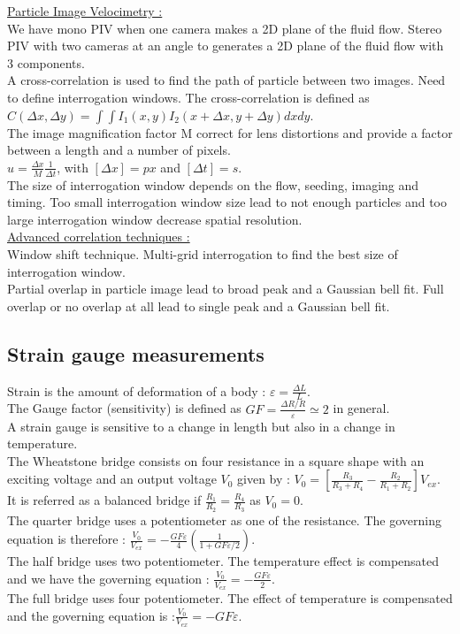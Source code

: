 \documentclass[../main.tex]{subfiles}
\begin{document}
\quad \underline{Particle Image Velocimetry :}\\
We have mono PIV when one camera makes a 2D plane of the fluid flow. Stereo PIV with two cameras at an angle to generates a 2D plane of the fluid flow with 3 components.\\
A cross-correlation is used to find the path of particle between two images. Need to define interrogation windows. The cross-correlation is defined as $C(\Delta x, \Delta y) = \int \int I_1(x,y) I_2(x+\Delta x, y+\Delta y) dxdy$.\\
The image magnification factor M correct for lens distortions and provide a factor between a length and a number of pixels.\\
$u = \frac{\Delta x}{M} \frac{1}{\Delta t}$, with $[\Delta x] = px$ and $[\Delta t] = s$.\\

The size of interrogation window depends on the flow, seeding, imaging and timing. Too small interrogation window size lead to not enough particles and too large interrogation window decrease spatial resolution.\\

\quad \underline{Advanced correlation techniques :}\\
Window shift technique. Multi-grid interrogation to find the best size of interrogation window.\\

Partial overlap in particle image lead to broad peak and a Gaussian bell fit. Full overlap or no overlap at all lead to single peak and a Gaussian bell fit.\\

\subsection{Strain gauge measurements}
Strain is the amount of deformation of a body : $\varepsilon = \frac{\Delta L}{L}$.\\
The Gauge factor (sensitivity) is defined as $GF = \frac{\Delta R/R}{\varepsilon} \simeq 2$ in general.\\
A strain gauge is sensitive to a change in length but also in a change in temperature.\\
The Wheatstone bridge consists on four resistance in a square shape with an exciting voltage and an output voltage $V_0$ given by : $V_0 = [\frac{R_3}{R_3+R_4} - \frac{R_2}{R_1+R_2}] V_{ex}$.\\
It is referred as a balanced bridge if $\frac{R_1}{R_2} = \frac{R_4}{R_3}$ as $V_0=0$.\\
The quarter bridge uses a potentiometer as one of the resistance. The governing equation is therefore : $\frac{V_0}{V_{ex}} = -\frac{GF \varepsilon}{4} (\frac{1}{1+GF \varepsilon/2})$.\\
The half bridge uses two potentiometer. The temperature effect is compensated and we have the governing equation : $\frac{V_0}{V_{ex}} = -\frac{GF \varepsilon}{2}$.\\
The full bridge uses four potentiometer. The effect of temperature is compensated and the governing equation is :$\frac{V_0}{V_{ex}} = -GF \varepsilon$.\\
\end{document}
